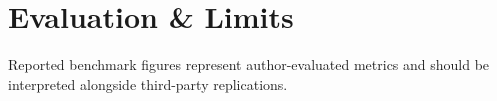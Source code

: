 \section{Evaluation & Limits}
\begin{claimboundary}
Reported benchmark figures represent author-evaluated metrics and should be interpreted alongside third-party replications.
\end{claimboundary}
